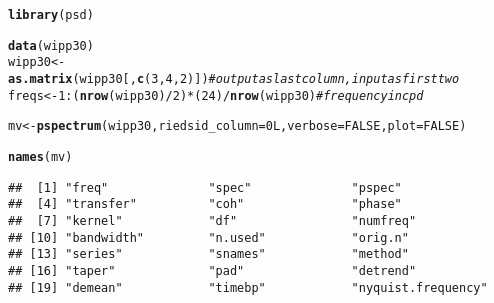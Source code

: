 \documentclass[11pt]{article}\usepackage[]{graphicx}\usepackage[]{color}
\makeatletter
\newcommand{\hlnum}[1]{\textcolor[rgb]{0.686,0.059,0.569}{#1}}%
\newcommand{\hlcom}[1]{\textcolor[rgb]{0.678,0.584,0.686}{\textit{#1}}}%
\newcommand{\hlopt}[1]{\textcolor[rgb]{0,0,0}{#1}}%
\newcommand{\hlstd}[1]{\textcolor[rgb]{0.345,0.345,0.345}{#1}}%
\newcommand{\hlkwb}[1]{\textcolor[rgb]{0.69,0.353,0.396}{#1}}%
\newcommand{\hlkwc}[1]{\textcolor[rgb]{0.333,0.667,0.333}{#1}}%
\newcommand{\hlkwd}[1]{\textcolor[rgb]{0.737,0.353,0.396}{\textbf{#1}}}%
\newenvironment{kframe}{%
 \def\at@end@of@kframe{}%
 \ifinner\ifhmode%
  \def\at@end@of@kframe{\end{minipage}}%
  \begin{minipage}{\columnwidth}%
 \fi\fi%
 \def\FrameCommand##1{\hskip\@totalleftmargin \hskip-\fboxsep
 \colorbox{shadecolor}{##1}\hskip-\fboxsep
     \hskip-\linewidth \hskip-\@totalleftmargin \hskip\columnwidth}%
 \MakeFramed {\advance\hsize-\width
   \@totalleftmargin\z@ \linewidth\hsize
   \@setminipage}}%
 {\par\unskip\endMakeFramed%
 \at@end@of@kframe}
\newenvironment{knitrout}{}{} %
\makeatother
\begin{document}
\begin{knitrout}
\color{fgcolor}\begin{kframe}
\begin{alltt}
\hlkwd{library}\hlstd{(psd)}
\end{alltt}


{\ttfamily\noindent\itshape\color{messagecolor}{\#\# Loaded psd (2.0.0) -- Adaptive multitaper spectrum estimation; to start, see ?pspectrum}}\begin{alltt}
\hlkwd{data}\hlstd{(wipp30)}
\hlstd{wipp30} \hlkwb{<-} \hlkwd{as.matrix}\hlstd{(wipp30[,} \hlkwd{c}\hlstd{(}\hlnum{3}\hlstd{,}\hlnum{4}\hlstd{,}\hlnum{2}\hlstd{)])} \hlcom{# output as last column, input as first two}
\hlstd{freqs} \hlkwb{<-} \hlnum{1}\hlopt{:}\hlstd{(}\hlkwd{nrow}\hlstd{(wipp30)}\hlopt{/}\hlnum{2}\hlstd{)} \hlopt{*} \hlstd{(}\hlnum{24}\hlstd{)} \hlopt{/} \hlkwd{nrow}\hlstd{(wipp30)} \hlcom{# frequency in cpd}
\end{alltt}
\end{kframe}
\end{knitrout}

\begin{knitrout}
\color{fgcolor}\begin{kframe}
\begin{alltt}
\hlstd{mv} \hlkwb{<-} \hlkwd{pspectrum}\hlstd{(wipp30,} \hlkwc{riedsid_column}\hlstd{=} \hlnum{0L}\hlstd{,} \hlkwc{verbose} \hlstd{=} \hlnum{FALSE}\hlstd{,} \hlkwc{plot} \hlstd{=} \hlnum{FALSE}\hlstd{)}
\end{alltt}
\end{kframe}
\end{knitrout}


\begin{knitrout}
\color{fgcolor}\begin{kframe}
\begin{alltt}
\hlkwd{names}\hlstd{(mv)}
\end{alltt}
\begin{verbatim}
##  [1] "freq"              "spec"              "pspec"            
##  [4] "transfer"          "coh"               "phase"            
##  [7] "kernel"            "df"                "numfreq"          
## [10] "bandwidth"         "n.used"            "orig.n"           
## [13] "series"            "snames"            "method"           
## [16] "taper"             "pad"               "detrend"          
## [19] "demean"            "timebp"            "nyquist.frequency"
\end{verbatim}
\end{kframe}
\end{knitrout}
\end{document}
